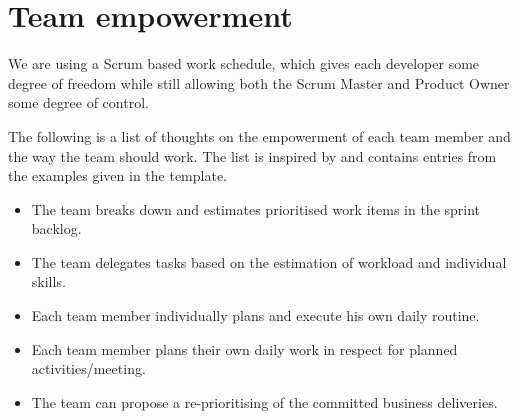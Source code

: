 \section{Team empowerment}

We are using a Scrum based work schedule, which gives each developer some degree of freedom while still allowing both the Scrum Master
and Product Owner some degree of control.

The following is a list of thoughts on the empowerment of each team member and the way the team should work. The list is inspired by and contains entries from the examples given in the template.
\begin{itemize}
    \item The team breaks down and estimates prioritised work items in the sprint backlog.
    \item The team delegates tasks based on the estimation of workload and individual skills.
    \item Each team member individually plans and execute his own daily routine.
    \item Each team member plans their own daily work in respect for planned activities/meeting.
    \item The team can propose a re-prioritising of the committed business deliveries.
\end{itemize}
